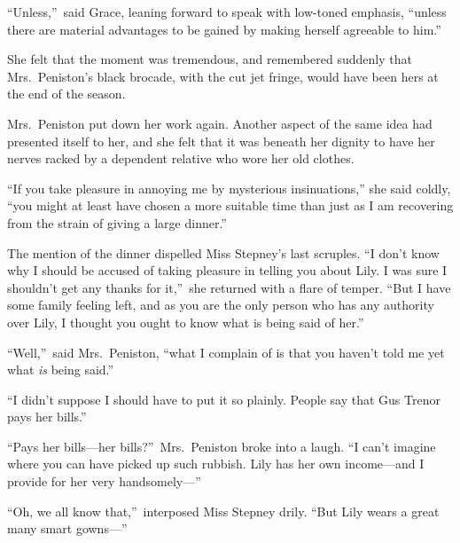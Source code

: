 \documentclass[12pt,a4paper]{book}
\begin{document}
``Unless,''\ said Grace, leaning forward to speak with low-toned
emphasis, ``unless there are material advantages to be gained by
making herself agreeable to him.''





She felt that the moment was tremendous, and remembered suddenly
that Mrs.\ Peniston's black brocade, with the cut jet fringe,
would have been hers at the end of the season.





Mrs.\ Peniston put down her work again. Another aspect of the same
idea had presented itself to her, and she felt that it was
beneath her dignity to have her nerves racked by a dependent
relative who wore her old clothes.





``If you take pleasure in annoying me by mysterious insinuations,''
she said coldly, ``you might at least have chosen a more suitable
time than just as I am recovering from the strain of giving a
large dinner.''





The mention of the dinner dispelled Miss Stepney's last scruples. 
``I don't know why I should be accused of taking pleasure in
telling you about Lily. I was sure I shouldn't get any thanks for
it,''\ she returned with a flare of temper. ``But I have some family
feeling left, and as you are the only person who has any
authority over Lily, I thought you ought to know what is being
said of her.''





``Well,''\ said Mrs.\ Peniston, ``what I complain of is that you
haven't told me yet what \textit{is} being said.''





``I didn't suppose I should have to put it so plainly. People say
that Gus Trenor pays her bills.''





``Pays her bills---her bills?''\ Mrs.\ Peniston broke into a laugh. ``I
can't imagine where you can have picked up such rubbish. Lily has
her own income---and I provide for her very handsomely---''





``Oh, we all know that,''\ interposed Miss Stepney drily. ``But Lily
wears a great many smart gowns---''
\end{document}
